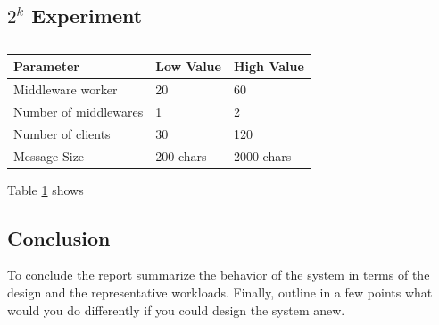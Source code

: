 \documentclass[11pt]{article}
\begin{document}
\subsection{$2^k$ Experiment}\label{sec:k-experiment}
\begin{table}
  \caption{}
  \label{tab:2kparam}
  \begin{center}
    \begin{tabular}{|l|l|l|}
       \hline
       Parameter & Low Value & High Value  \\ \hline 
       Middleware worker & 20 & 60 \\\hline 
       Number of middlewares & 1 & 2 \\\hline 
       Number of clients & 30 & 120 \\\hline 
       Message Size & 200 chars & 2000 chars \\\hline 
    \end{tabular}
  \end{center}
\end{table}
Table \ref{tab:2kparam} shows


\subsection{Conclusion}\label{sec:conclusion}

To conclude the report summarize the behavior of the system in terms of
the design and the representative workloads. Finally, outline in a few
points what would you do differently if you could design the system
anew.
\end{document}
